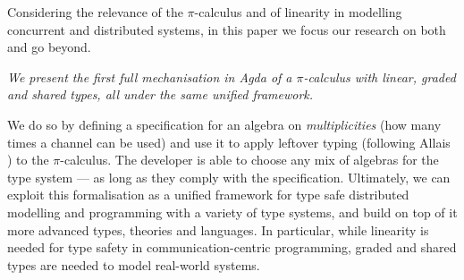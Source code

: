 \documentclass[a4paper,UKenglish,cleveref,autoref,thm-restate,authorcolumns]{lipics-v2019}
\theoremstyle{definition}
\newcommand{\picalc}{$\pi$-calculus}
\begin{document}
Considering the relevance of the \picalc{} and of linearity in modelling concurrent and distributed systems, in this paper we focus our research on both and go beyond.

\emph{We present the first full mechanisation in Agda of a \picalc{} with linear, graded and shared types, all under the same unified framework.}

We do so by defining a specification for an algebra on \emph{multiplicities} (how many times a channel can be used) and use it to apply leftover typing (following Allais \cite{Allais2018a}) to the \picalc{}.
The developer is able to choose any mix of algebras for the type system --- as long as they comply with the specification.
Ultimately, we can exploit this formalisation as a unified framework for type safe distributed modelling and programming with a variety of type systems, and build on top of it more advanced types, theories and languages.
In particular, while linearity is needed for type safety in communication-centric programming, graded and shared types are needed to model real-world systems.
\end{document}
